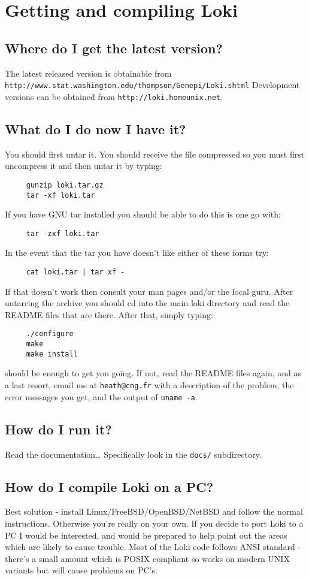 \documentclass[10pt]{article}
\begin{document}
\section{Getting and compiling Loki}
\subsection{Where do I get the latest version?}
The latest released version is obtainable from
\verb+http://www.stat.washington.edu/thompson/Genepi/Loki.shtml+
Development versions can be obtained from
\verb+http://loki.homeunix.net+.
\subsection{What do I do now I have it?}
You should first untar it.  You should receive the file compressed so you
must first uncompress it and then untar it by typing:
\begin{verbatim}
	 gunzip loki.tar.gz
	 tar -xf loki.tar
\end{verbatim}
If you have GNU tar installed you should be able to do this is one go with:
\begin{verbatim}
	 tar -zxf loki.tar
\end{verbatim}
In the event that the tar you have doesn't like either of these forms try:
\begin{verbatim}
	 cat loki.tar | tar xf -
\end{verbatim}
If that doesn't work then consult your man pages and/or the local guru.
After untarring the archive you should cd into the main loki directory and
read the README files that are there.  After that, simply typing:
\begin{verbatim}
	 ./configure
	 make
	 make install
\end{verbatim}
should be enough to get you going.  If not, read the README files again, and
as a last resort, email me at \verb+heath@cng.fr+ with a description of the
problem, the error messages you get, and the output of \verb+uname -a+.
\subsection{How do I run it?}
Read the documentation{\ldots} Specifically look in the \verb+docs/+ subdirectory.
\subsection{How do I compile Loki on a PC?}
\label{pc_quest}
Best solution - install Linux/FreeBSD/OpenBSD/NetBSD and follow the normal
instructions.  Otherwise you're really on your own.  If you decide to port
Loki to a PC I would be interested, and would be prepared to help point out
the areas which are likely to cause trouble.  Most of the Loki code follows ANSI
standard - there's a small amount which is POSIX compliant so works on
modern UNIX variants but will cause problems on PC's.
\end{document}

